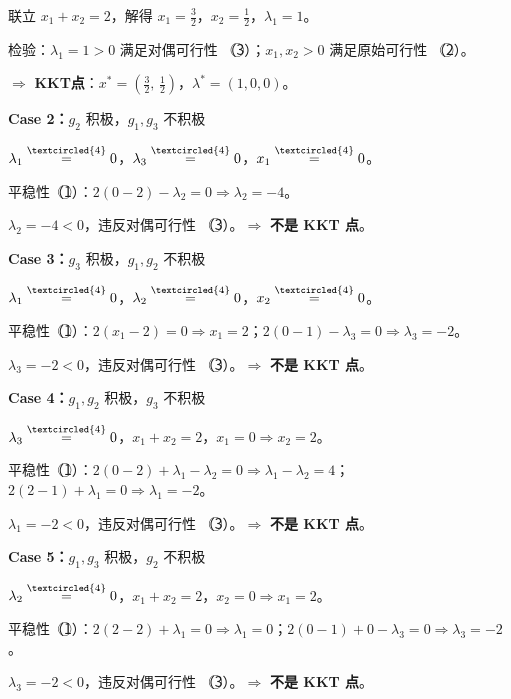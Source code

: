 \begin{example}[KKT条件求解]
联立 $x_1 + x_2 = 2$，解得 $x_1 = \frac{3}{2}$，$x_2 = \frac{1}{2}$，$\lambda_1 = 1$。

检验：$\lambda_1 = 1 > 0$ 满足对偶可行性 （\textcircled{3}）；$x_1,x_2 > 0$ 满足原始可行性 （\textcircled{2}）。

$\Rightarrow$ \textbf{KKT点}：$x^* = \left(\frac{3}{2},\, \frac{1}{2}\right)$，$\lambda^* = (1, 0, 0)$。

\bigskip\noindent\textbf{Case 2：}$g_2$ 积极，$g_1,g_3$ 不积极

$\lambda_1 \stackrel{\textcircled{4}}{=} 0$，$\lambda_3 \stackrel{\textcircled{4}}{=} 0$，$x_1 \stackrel{\textcircled{4}}{=} 0$。

平稳性（\textcircled{1}）：$2(0-2) - \lambda_2 = 0 \Rightarrow \lambda_2 = -4$。

$\lambda_2 = -4 < 0$，违反对偶可行性 （\textcircled{3}）。$\Rightarrow$ \textbf{不是 KKT 点}。

\bigskip\noindent\textbf{Case 3：}$g_3$ 积极，$g_1,g_2$ 不积极

$\lambda_1 \stackrel{\textcircled{4}}{=} 0$，$\lambda_2 \stackrel{\textcircled{4}}{=} 0$，$x_2 \stackrel{\textcircled{4}}{=} 0$。

平稳性（\textcircled{1}）：$2(x_1-2) = 0 \Rightarrow x_1 = 2$；$2(0-1) - \lambda_3 = 0 \Rightarrow \lambda_3 = -2$。

$\lambda_3 = -2 < 0$，违反对偶可行性 （\textcircled{3}）。$\Rightarrow$ \textbf{不是 KKT 点}。

\bigskip\noindent\textbf{Case 4：}$g_1,g_2$ 积极，$g_3$ 不积极

$\lambda_3 \stackrel{\textcircled{4}}{=} 0$，$x_1 + x_2 = 2$，$x_1 = 0 \Rightarrow x_2 = 2$。

平稳性（\textcircled{1}）：$2(0-2) + \lambda_1 - \lambda_2 = 0 \Rightarrow \lambda_1 - \lambda_2 = 4$；$2(2-1) + \lambda_1 = 0 \Rightarrow \lambda_1 = -2$。

$\lambda_1 = -2 < 0$，违反对偶可行性 （\textcircled{3}）。$\Rightarrow$ \textbf{不是 KKT 点}。

\bigskip\noindent\textbf{Case 5：}$g_1,g_3$ 积极，$g_2$ 不积极

$\lambda_2 \stackrel{\textcircled{4}}{=} 0$，$x_1 + x_2 = 2$，$x_2 = 0 \Rightarrow x_1 = 2$。

平稳性（\textcircled{1}）：$2(2-2) + \lambda_1 = 0 \Rightarrow \lambda_1 = 0$；$2(0-1) + 0 - \lambda_3 = 0 \Rightarrow \lambda_3 = -2$。

$\lambda_3 = -2 < 0$，违反对偶可行性 （\textcircled{3}）。$\Rightarrow$ \textbf{不是 KKT 点}。


\end{example}
